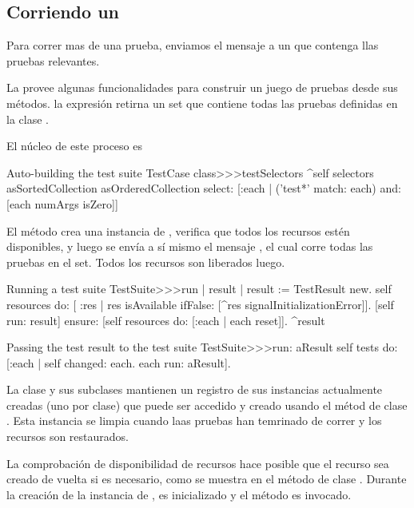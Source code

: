 \documentclass[a4paper,10pt,twoside]{book}
\begin{document}
\subsection{Corriendo un }

Para correr mas de una prueba, enviamos el mensaje  a un  que contenga
llas pruebas relevantes.

La  provee algunas funcionalidades para construir un juego de pruebas desde sus m\'etodos.
la expresi\'on  retirna un set que contiene todas las 
pruebas definidas en la clase  .

El n\'ucleo de este proceso es
\begin{method}[testcasetestselectors]{Auto-building the test suite}
TestCase class>>>testSelectors 
	^self selectors asSortedCollection asOrderedCollection select: [:each | 
		('test*' match: each) and: [each numArgs isZero]]
\end{method}

El m\'etodo  crea una instancia de , verifica que todos los
recursos est\'en disponibles, y luego se env\'ia a s\'i mismo el mensaje , 
el cual corre todas las pruebas en el set. Todos los recursos son liberados luego.

\begin{method}[testsuiterun]{Running a test suite}
TestSuite>>>run
	| result |
 	result := TestResult new.
	self resources do: [ :res |
		res isAvailable ifFalse: [^res signalInitializationError]].
	[self run: result] ensure: [self resources do: [:each | each reset]].
	^result
\end{method}

\begin{method}[testsuiterun:]{Passing the test result to the test suite}
TestSuite>>>run: aResult
	self tests do: [:each | 
		self changed: each.
		each run: aResult].
\end{method}


La clase  y sus subclases mantienen un registro de sus instancias
actualmente creadas (uno por clase) que puede ser accedido y creado usando el m\'etod de clase
. Esta instancia se limpia cuando laas pruebas
han temrinado de correr y los recursos son restaurados.

La comprobaci\'on de disponibilidad de recursos hace posible que el recurso sea creado de vuelta si es necesario,
como se muestra en el m\'etodo de clase . Durante la
creaci\'on de la instancia de  , es inicializado y el m\'etodo  
es invocado.
\end{document}
